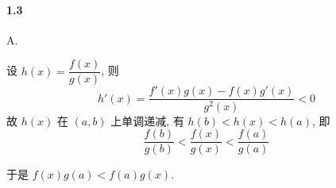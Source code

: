 \paragraph*{1.3} A. 

设 $h(x)=\dfrac{f(x)}{g(x)}$, 则 
\[
	h'(x)=\dfrac{f'(x)g(x)-f(x)g'(x)}{g^2(x)}<0
\]
故 $h(x)$ 在 $(a,b)$ 上单调递减, 有 $h(b)<h(x)<h(a)$, 即
\[
	\dfrac{f(b)}{g(b)}<\dfrac{f(x)}{g(x)}<\dfrac{f(a)}{g(a)}
\]

于是 $f(x)g(a)<f(a)g(x)$.